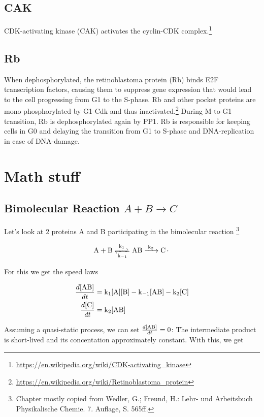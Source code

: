 \documentclass{article}
\begin{document}
	\subsection{CAK}
	CDK-activating kinase (CAK) activates the cyclin-CDK complex.\footnote{\url{https://en.wikipedia.org/wiki/CDK-activating_kinase}}
	
	\subsection{Rb}
	When dephosphorylated, the retinoblastoma protein (Rb) binds E2F transcription factors, causing them to suppress gene expression that would lead to the cell progressing from G1 to the S-phase. Rb and other pocket proteins are mono-phosphorylated by G1-Cdk and thus inactivated.\footnote{\url{https://en.wikipedia.org/wiki/Retinoblastoma_protein}} During M-to-G1 transition, Rb is dephosphorylated again by PP1. Rb is responsible for keeping cells in G0 and delaying the transition from G1 to S-phase and DNA-replication in case of DNA-damage.
	
	\section{Math stuff}
	
	\subsection{Bimolecular Reaction $A + B \rightarrow C$}
	Let's look at 2 proteins A and B participating in the bimolecular reaction \footnote{Chapter mostly copied from Wedler, G.; Freund, H.: Lehr- und Arbeitsbuch Physikalische Chemie. 7. Auflage, S. 565ff.}
	
	\begin{equation}
	\ce{A + B <=>[\ce{k_1}][\ce{k_{-1}}] {AB} ->[\ce{k_2}] C.}
	\end{equation}

	For this we get the speed laws
	
	\begin{align}
		\frac{d[{\ce{AB}}]}{dt} &= \ce{k_1[A][B]} - \ce{k_{-1}[AB]} - \ce{k_2[C]}\\
		\frac{d\ce{[C]}}{dt} &= \ce{k_2[{AB}]}
	\end{align}
	
	Assuming a quasi-static process, we can set $\frac{d[{\ce{AB}}]}{dt} = 0$: The intermediate product is short-lived and its concentation approximately constant. With this, we get
	
\end{document}
